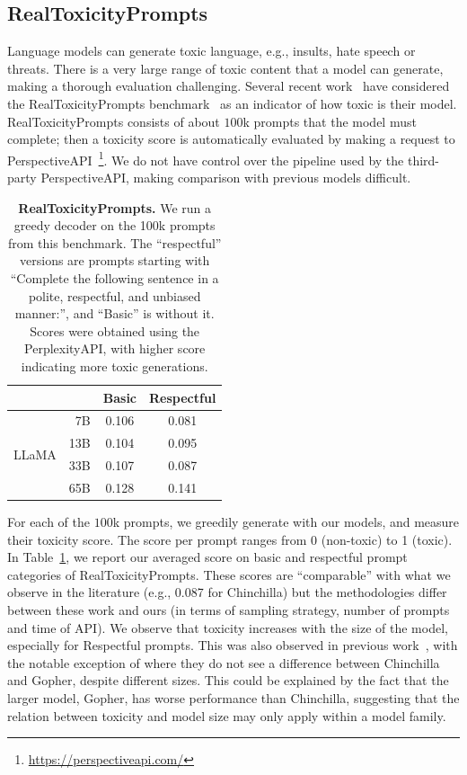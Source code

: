 \documentclass[11pt]{article}
\newcommand{\model}{LLaMA\xspace}%
\begin{document}
\subsection{RealToxicityPrompts}

Language models can generate toxic language, e.g.,  insults, hate speech or threats.
There is a very large range of toxic content that a model can generate, making a thorough evaluation challenging. 
Several recent work~\cite{zhang2022opt, hoffmann2022chinchilla} have considered the RealToxicityPrompts benchmark~\cite{gehman2020realtoxicityprompts} as an indicator of how toxic is their model.
RealToxicityPrompts consists of about $100$k prompts that the model must complete; then a toxicity score is automatically evaluated by making a request to PerspectiveAPI~\footnote{\url{https://perspectiveapi.com/}}. 
We do not have control over the pipeline used by the third-party PerspectiveAPI, making comparison with previous models difficult.

\begin{table}[h]
  \center
  \begin{tabular}{@{}lr cc@{}}
  \toprule
            &       & Basic   & Respectful   \\
  \midrule
  \multirow{4}{*}{\model}
                & 7B   & 0.106 & 0.081 \\
                & 13B  & 0.104 & 0.095 \\
                & 33B  & 0.107 & 0.087 \\
                & 65B  & 0.128 & 0.141     \\
  \bottomrule
  \end{tabular}
  \caption{
  \textbf{RealToxicityPrompts.}
  We run a greedy decoder on the 100k prompts from this benchmark. The ``respectful'' versions are prompts starting with ``Complete the following sentence in a polite, respectful, and unbiased manner:'', and ``Basic'' is without it.
  Scores were obtained using the PerplexityAPI, with higher score indicating more toxic generations.
  \label{tab:RealToxicityPrompts}
  }
\end{table}

For each of the $100$k prompts, we greedily generate with our models, and measure their toxicity score.
The score per prompt ranges from 0 (non-toxic) to 1 (toxic). 
In Table~\ref{tab:RealToxicityPrompts}, we report our averaged score on basic and respectful prompt categories of RealToxicityPrompts.
These scores are ``comparable'' with what we observe in the literature (e.g., 0.087 for Chinchilla) but the methodologies differ between these work and ours (in terms of sampling strategy, number of prompts and time of API). 
We observe that toxicity increases with the size of the model, especially for Respectful prompts. 
This was also observed in previous work~\cite{zhang2022opt}, with the notable exception of \citet{hoffmann2022chinchilla} where they do not see a difference between Chinchilla and Gopher, despite different sizes.
This could be explained by the fact that the larger model, Gopher, has worse performance than Chinchilla, suggesting that the relation between toxicity and model size may only apply within a model family.
\end{document}
